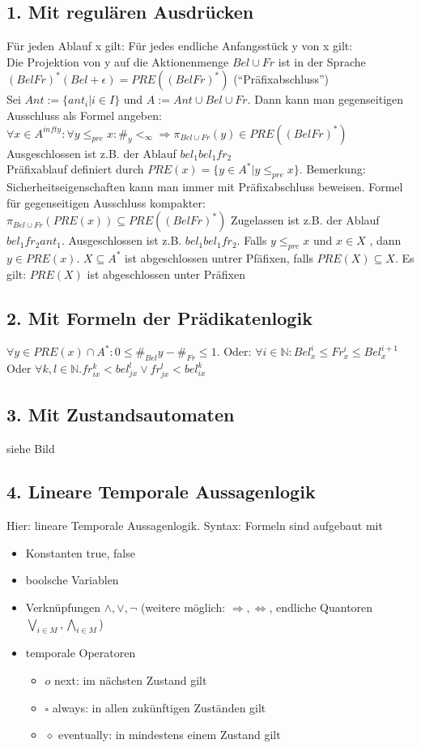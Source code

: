 \subsection*{1. Mit regulären Ausdrücken}
Für jeden Ablauf x gilt: Für jedes endliche Anfangsstück y von x gilt:\\
Die Projektion von y auf die Aktionenmenge $Bel \cup Fr$ ist in der Sprache $(Bel Fr)^*(Bel + \epsilon) = PRE((Bel Fr)^*)$ ("`Präfixabschluss"')\\
Sei $Ant:=\{ant_i | i \in I\}$ und $A:=Ant \cup Bel \cup Fr$. Dann kann man gegenseitigen Ausschluss als Formel angeben: $\forall x \in A^{infty}: \forall y \leq_{pre} x: \#_y <_\infty \Rightarrow \pi_{Bel \cup Fr}(y) \in PRE((Bel Fr)^*)$ Ausgeschlossen ist z.B. der Ablauf $bel_1 bel_1 fr_2$\\
Präfixablauf definiert durch $PRE(x)= \{y \in A^* | y \leq_{pre} x \}$.
Bemerkung: Sicherheitseigenschaften kann man immer mit Präfixabschluss beweisen.
Formel für gegenseitigen Ausschluss kompakter: $\pi_{Bel \cup Fr}(PRE(x)) \subseteq PRE((Bel Fr)^*)$
Zugelassen ist z.B. der Ablauf $bel_1 fr_2 ant_1$. Ausgeschlossen ist z.B. $bel_1 bel_1 fr_2$.
Falls $y \leq_{pre} x$ und $x \in X$ , dann $y \in PRE(x)$.
$X \subseteq A^*$ ist abgeschlossen untrer Pfäfixen, falls $PRE(X) \subseteq X$. Es gilt: $PRE(X)$ ist abgeschlossen unter Präfixen
\subsection*{2. Mit Formeln der Prädikatenlogik}
$\forall y \in PRE(x) \cap A^*: 0 \leq \#_{Bel}y - \#_{Fr} \leq 1$.
Oder: $\forall i \in \mathbb{N}: Bel_x^i \leq Fr_x^i \leq Bel_x^{i+1}$
Oder $\forall k,l \in \mathbb{N}. fr_{i x}^k < bel_{j x}^l \lor fr_{j x}^l < bel_{i x}^k$

\subsection*{3. Mit Zustandsautomaten}
siehe Bild

\subsection*{4. Lineare Temporale Aussagenlogik}
Hier: lineare Temporale Aussagenlogik.
Syntax: Formeln sind aufgebaut mit
\begin{itemize}
	\item Konstanten true, false
	\item boolsche Variablen
	\item Verknüpfungen $\land, \lor, \neg$ (weitere möglich: $\Rightarrow, \Leftrightarrow$, endliche Quantoren $\bigvee_{i \in M}, \bigwedge_{i \in M}$)
	\item temporale Operatoren
	\begin{itemize}
		\item $o$ next: im nächsten Zustand gilt
		\item $\square$ always: in allen zukünftigen Zuständen gilt
		\item $\diamond$ eventually: in mindestens einem Zustand gilt
	\end{itemize}
\end{itemize}

